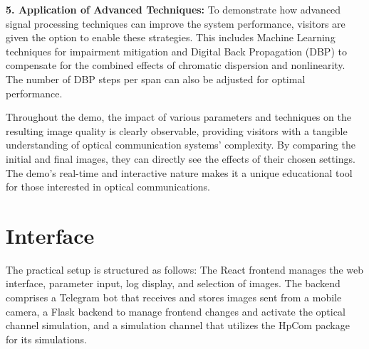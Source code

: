 \textbf{5. Application of Advanced Techniques:} To demonstrate how advanced signal processing techniques can improve the system performance, visitors are given the option to enable these strategies. This includes Machine Learning techniques for impairment mitigation and Digital Back Propagation (DBP) to compensate for the combined effects of chromatic dispersion and nonlinearity. The number of DBP steps per span can also be adjusted for optimal performance.


Throughout the demo, the impact of various parameters and techniques on the resulting image quality is clearly observable, providing visitors with a tangible understanding of optical communication systems' complexity. By comparing the initial and final images, they can directly see the effects of their chosen settings. The demo's real-time and interactive nature makes it a unique educational tool for those interested in optical communications.






\section{Interface}

The practical setup is structured as follows: The React frontend manages the web interface, parameter input, log display, and selection of images. The backend comprises a Telegram bot that receives and stores images sent from a mobile camera, a Flask backend to manage frontend changes and activate the optical channel simulation, and a simulation channel that utilizes the HpCom package for its simulations. 

